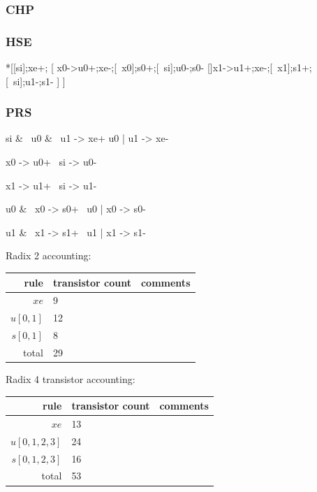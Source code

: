 \documentclass{article}
\begin{document}
\subsubsection*{CHP}

\subsubsection*{HSE}

\begin{hse}
*[[si];xe+;
    [ x0->u0+;xe-;[~x0];s0+;[~si];u0-;s0-
    []x1->u1+;xe-;[~x1];s1+;[~si];u1-;s1-
    ]
 ]
\end{hse}

\subsubsection*{PRS}

\begin{prs2}
si & ~u0 & ~u1 -> xe+
u0 | u1 -> xe-
\end{prs2}

\begin{prs2}
x0 -> u0+
~si -> u0-

x1 -> u1+
~si -> u1-

u0 & ~x0 -> s0+
~u0 | x0 -> s0-

u1 & ~x1 -> s1+
~u1 | x1 -> s1-
\end{prs2}

\noindent
Radix 2 accounting:

\begin{center}
    \begin{tabular}{|r|l|l|}
    \hline
    rule & transistor count & comments \\ \hline
    $xe$ & 9 & \\ \hline
    $u[0,1]$ & 12 & \\ \hline
    $s[0,1]$ & 8 & \\ \hline
    \hline total & 29 & \\ \hline
    \end{tabular}
\end{center}

\noindent
Radix 4 transistor accounting:

\begin{center}
    \begin{tabular}{|r|l|l|}
    \hline
    rule & transistor count & comments \\ \hline
    $xe$ & 13 & \\ \hline
    $u[0,1,2,3]$ & 24 & \\ \hline
    $s[0,1,2,3]$ & 16 & \\ \hline
    \hline total & 53 & \\ \hline
    \end{tabular}
\end{center}
\end{document}
